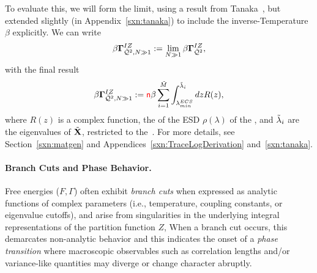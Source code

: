 
To evaluate this, we will form the \LargeN limit, using a result from Tanaka~\cite{Tanaka2007,Tanaka2008},
but extended slightly (in Appendix~\ref{sxn:tanaka}) to include the inverse-Temperature $\beta$ explicitly.
We can write
\begin{align}
  \label{eqn:izgin_def}
  \beta\mathbf{\Gamma}^{IZ}_{\bar{\mathcal{Q}}^{2},N\gg 1}:=\lim_{N\gg 1}\beta\mathbf{\Gamma}^{IZ}_{\bar{\mathcal{Q}}^{2}} ,
\end{align}
with the final result
  \begin{align}
    \label{eqn:hciz_tanaka}
    \beta\mathbf{\Gamma}^{IZ}_{\bar{\mathcal{Q}}^{2},N\gg 1}:={\color{red}\sf{n}}\beta\sum_{i=1}^{\tilde{M}}\int^{\tilde{\lambda}_{i}}_{\lambda^{ECS}_{min}} dz R(z) ,
\end{align}
where $R(z)$ is a complex function, the \RTransform of the ESD $\rho(\lambda)$ of the \Teacher, and $\tilde{\lambda}_{i}$ are the eigenvalues of \Teacher \CorrelationMatrix $\tilde{\mathbf{X}}$, restricted to the~\ECS.
For more details, see Section~\ref{sxn:matgen} and Appendices~\ref{sxn:TraceLogDerivation} and~\ref{sxn:tanaka}.

\paragraph{Branch Cuts and Phase Behavior.}
Free energies ($F,\Gamma$)  often exhibit \emph{branch cuts} when expressed as analytic functions 
of complex parameters (i.e., temperature, coupling constants, or eigenvalue cutoffs),
and arise from singularities in the underlying integral representations of the partition function $Z$,
When a branch cut occurs, this demarcates non-analytic behavior
and this indicates the onset of a \emph{phase transition} where
macroscopic observables such as correlation lengths and/or variance-like quantities
may diverge or change character abruptly.  

